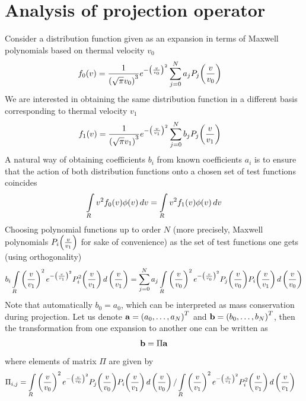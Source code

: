 \documentclass{article}[draft]
\begin{document}
\section{Analysis of projection operator}
Consider a distribution function given as an expansion in terms of Maxwell polynomials based on thermal velocity $v_0$
\begin{align*}
f_0\of{v} &= \frac{1}{\left( \sqrt{\pi} v_0 \right)^3} e^{-\left( \frac{v}{v_0} \right)^2} \sum_{j=0}^{N} a_j P_j\of{\frac{v}{v_0}}
\end{align*}
We are interested in obtaining the same distribution function in a different basis corresponding to thermal velocity $v_1$
\begin{align*}
f_1 \of{v} &= \frac{1}{\left( \sqrt{\pi} v_1 \right)^3} e^{-\left( \frac{v}{v_1} \right)^2} \sum_{j=0}^{N} b_j P_j\of{\frac{v}{v_1}}
\end{align*}
A natural way of obtaining coefficients $b_i$ from known coefficients $a_i$ is to ensure that the action of both distribution functions onto a chosen set of test functions coincides
\begin{align*}
\myint_{R} {v}^2 f_0\of{v} \phi\of{v} \diff{v} = 
\myint_{R} {v}^2 f_1\of{v} \phi\of{v} \diff{v}
\end{align*}
Choosing polynomial functions up to order $N$ (more precisely, Maxwell polynomials $P_i\of{\frac{v}{v_1}}$ for sake of convenience) as the set of test functions one gets (using orthogonality)
\begin{align*}
b_i \myint_{R} \left( \frac{v}{v_1} \right)^2 e^{-\left( \frac{v}{v_1} \right)^2} P^2_i\of{\frac{v}{v_1}} \diff{\left(\frac{v}{v_1}\right)} = 
\sum_{j=0}^{N} a_j
\myint_{R} \left( \frac{v}{v_0} \right)^2 e^{-\left( \frac{v}{v_0} \right)^2}  P_j\of{\frac{v}{v_0}} P_i\of{\frac{v}{v_1}} \diff{\left(\frac{v}{v_0}\right)} 
\end{align*}
Note that automatically $b_0 = a_0$, which can be interpreted as mass conservation during projection. 
Let us denote $\mathbf{a} = \left( a_0,\ldots, a_N \right)^T$ and $\mathbf{b} = \left( b_0,\ldots, b_N \right)^T$, then the transformation from one expansion to another one can be written as 
\begin{align*}
\mathbf{b} = \Pi \mathbf{a}
\end{align*}
where elements of matrix $\Pi$ are given by
\begin{align*}
\Pi_{i,j} &= \myint_{R} \left( \frac{v}{v_0} \right)^2 e^{-\left( \frac{v}{v_0} \right)^2} P_j\of{\frac{v}{v_0}} P_i\of{\frac{v}{v_1}} \diff{\left(\frac{v}{v_0}\right)} 
/ 
\myint_{R} \left( \frac{v}{v_1} \right)^2 e^{-\left( \frac{v}{v_1} \right)^2} P^2_i\of{\frac{v}{v_1}} \diff{\left(\frac{v}{v_1}\right)}
\end{align*}
\end{document}
